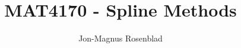 \documentclass{memoir}
\title{MAT4170 \-- Spline Methods}
\author{Jon-Magnus Rosenblad}
\date{}
\begin{document}
\maketitle
\tableofcontents
\listoftodos

\end{document}
